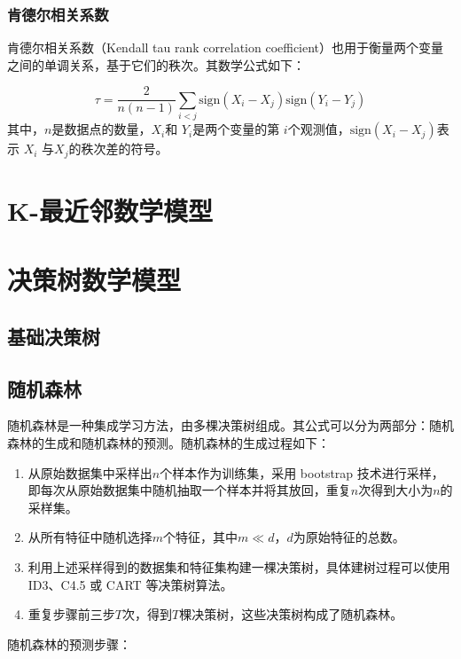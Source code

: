 \documentclass[UTF8,12pt]{ctexart}
\begin{document}
	\subsubsection{肯德尔相关系数}
	
	肯德尔相关系数（Kendall tau rank correlation coefficient）也用于衡量两个变量之间的单调关系，基于它们的秩次。其数学公式如下：
	
	\begin{equation}
		\tau = \frac{2}{n(n-1)}\sum_{i < j} \text{sign}(X_i - X_j)\text{sign}(Y_i - Y_j)
	\end{equation}
	其中，$ n$是数据点的数量，$X_i$和 $Y_i$是两个变量的第 $ i$个观测值，$\text{sign}(X_i - X_j)$表示 $X_i$ 与$X_j$的秩次差的符号。
	
	
	\section{K-最近邻数学模型}
	
	\section{决策树数学模型}
	
	\subsection{基础决策树}
	
	\subsection{随机森林}
	
	随机森林是一种集成学习方法，由多棵决策树组成。其公式可以分为两部分：随机森林的生成和随机森林的预测。随机森林的生成过程如下：
	
	\begin{enumerate}
		\item 从原始数据集中采样出$n$个样本作为训练集，采用 bootstrap 技术进行采样，即每次从原始数据集中随机抽取一个样本并将其放回，重复$n$次得到大小为$n$的采样集。
		\item 从所有特征中随机选择$m$个特征，其中$m\ll d$，$d$为原始特征的总数。
		\item 利用上述采样得到的数据集和特征集构建一棵决策树，具体建树过程可以使用 ID3、C4.5 或 CART 等决策树算法。
		\item 重复步骤前三步$T$次，得到$T$棵决策树，这些决策树构成了随机森林。
	\end{enumerate}
	
	
	随机森林的预测步骤：
	
\end{document}
